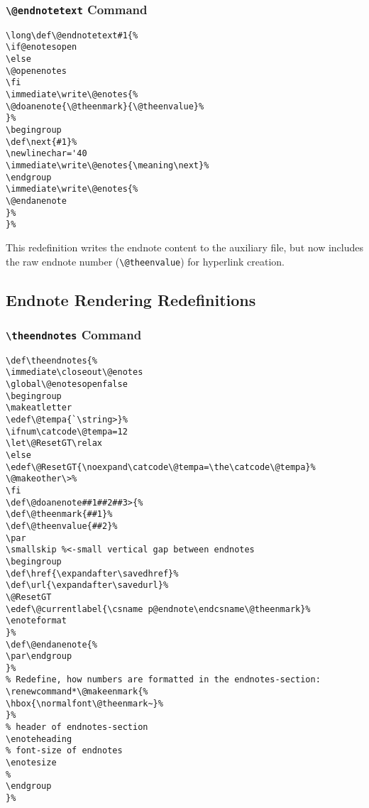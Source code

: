 \documentclass[11pt]{article}
\newcommand{\cmd}[1]{\texttt{\textbackslash#1}}
\begin{document}
\subsubsection{\cmd{@endnotetext} Command}

\begin{tcolorbox}[colback=gray!5, colframe=gray!75, title=@endnotetext Redefinition]
\begin{lstlisting}
\long\def\@endnotetext#1{%
\if@enotesopen
\else
\@openenotes
\fi
\immediate\write\@enotes{%
\@doanenote{\@theenmark}{\@theenvalue}%
}%
\begingroup
\def\next{#1}%
\newlinechar='40
\immediate\write\@enotes{\meaning\next}%
\endgroup
\immediate\write\@enotes{%
\@endanenote
}%
}%
\end{lstlisting}
\end{tcolorbox}

This redefinition writes the endnote content to the auxiliary file, but now includes the raw endnote number (\cmd{@theenvalue}) for hyperlink creation.

\subsection{Endnote Rendering Redefinitions}

\subsubsection{\cmd{theendnotes} Command}

\begin{tcolorbox}[colback=gray!5, colframe=gray!75, title=theendnotes Redefinition]
\begin{lstlisting}
\def\theendnotes{%
\immediate\closeout\@enotes
\global\@enotesopenfalse
\begingroup
\makeatletter
\edef\@tempa{`\string>}%
\ifnum\catcode\@tempa=12
\let\@ResetGT\relax
\else
\edef\@ResetGT{\noexpand\catcode\@tempa=\the\catcode\@tempa}%
\@makeother\>%
\fi
\def\@doanenote##1##2##3>{%
\def\@theenmark{##1}%
\def\@theenvalue{##2}%
\par
\smallskip %<-small vertical gap between endnotes
\begingroup
\def\href{\expandafter\savedhref}%
\def\url{\expandafter\savedurl}%
\@ResetGT
\edef\@currentlabel{\csname p@endnote\endcsname\@theenmark}%
\enoteformat
}%
\def\@endanenote{%
\par\endgroup
}%
% Redefine, how numbers are formatted in the endnotes-section:
\renewcommand*\@makeenmark{%
\hbox{\normalfont\@theenmark~}%
}%
% header of endnotes-section
\enoteheading
% font-size of endnotes
\enotesize
%
\endgroup
}%
\end{lstlisting}
\end{tcolorbox}
\end{document}
